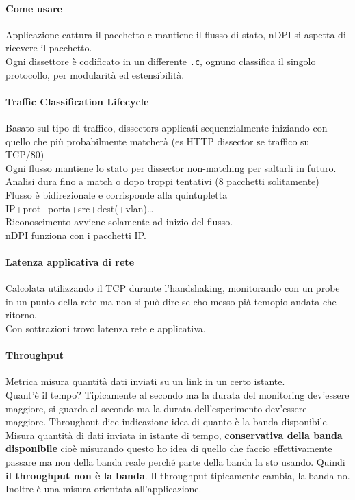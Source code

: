 \documentclass[10pt]{book}
\begin{document}
\paragraph{Come usare} Applicazione cattura il pacchetto e mantiene il flusso di stato, nDPI si aspetta di ricevere il pacchetto.\\
Ogni dissettore è codificato in un differente \texttt{.c}, ognuno classifica il singolo protocollo, per modularità ed estensibilità.
\paragraph{Traffic Classification Lifecycle} Basato sul tipo di traffico, dissectors applicati sequenzialmente iniziando con quello che più probabilmente matcherà (es HTTP dissector se traffico su TCP/80)\\
Ogni flusso mantiene lo stato per dissector non-matching per saltarli in futuro.\\
Analisi dura fino a match o dopo troppi tentativi (8 pacchetti solitamente)\\
Flusso è bidirezionale e corrisponde alla quintupletta IP+prot+porta+src+dest(+vlan)\ldots\\
Riconoscimento avviene solamente ad inizio del flusso.\\
nDPI funziona con i pacchetti IP.
\paragraph{Latenza applicativa di rete} Calcolata utilizzando il TCP durante l'handshaking, monitorando con un probe in un punto della rete ma non si può dire se cho messo pià temopio andata che ritorno.\\
Con sottrazioni trovo latenza rete e applicativa.
\paragraph{Throughput} Metrica misura quantità dati inviati su un link in un certo istante.\\
Quant'è il tempo? Tipicamente al secondo ma la durata del monitoring dev'essere maggiore, si guarda al secondo ma la durata dell'esperimento dev'essere maggiore. Throughout dice  indicazione idea di quanto è la banda disponibile.\\
Misura quantità di dati inviata in istante di tempo, \textbf{conservativa della banda disponibile} cioè misurando questo ho idea di quello che faccio effettivamente passare ma non della banda reale perché parte della banda la sto usando. Quindi \textbf{il throughput non è la banda}. Il throughput tipicamente cambia, la banda no. Inoltre è una misura orientata all'applicazione.
\end{document}
